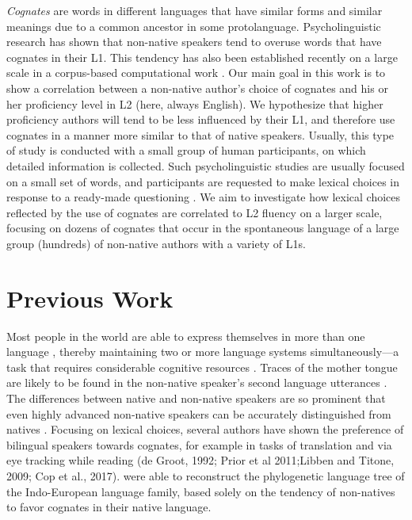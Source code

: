 \documentclass[11pt]{article}
\newcommand{\note}[1]{\textit{\small\color{magenta}{#1}}}
\begin{document}
\emph{Cognates} are words in different languages that have  similar forms and similar meanings due to a common ancestor in some protolanguage. Psycholinguistic research has shown that non-native speakers tend to overuse words that have cognates in their L1.  This tendency has also been established recently on a large scale in a corpus-based computational work \citep{TACL1403}.
Our main goal in this work is  to show a correlation between a non-native author's choice of cognates and his or her proficiency level in L2 (here, always English). 
We hypothesize that higher proficiency authors will tend to be less influenced by their L1, and therefore use cognates in a manner more similar to that of native speakers.
Usually, this type of study is conducted with a small group of human participants, on which detailed information is collected.  Such psycholinguistic studies are usually focused on a small set of words, and participants are requested to make lexical choices in response to a ready-made questioning \citep{prior:2006a,BIL:8852637}.
\note{Anat, please confirm}
We aim to investigate how lexical choices reflected by the use of cognates are correlated to L2 fluency on a larger scale, focusing on dozens of cognates that occur in the spontaneous language of a large group (hundreds) of non-native authors with a variety of L1s.

\section{Previous Work}

Most people in the world are able to express themselves in more than one language \citep{grosjean2012psycholinguistics}, thereby maintaining two or more language systems simultaneously---a task that requires considerable cognitive resources  \citep{schlesinger:2003,hvelplund2014eye,Prior2014,Kroll_Bobb_Hoshino_2014}.
Traces of the mother tongue are likely to be found in the non-native speaker's second language utterances \citep{jarvis2008crosslinguistic}. The differences between native and non-native speakers are so prominent that even highly advanced non-native speakers can be accurately distinguished from natives \citep{tomokiyo2001you,bergsma2012stylometric,DBLP:conf/acl/RabinovichNOW16,D18-1395}. 
Focusing on lexical choices, several authors have shown the preference of bilingual speakers towards cognates, for example in tasks of translation and via eye tracking while reading  (de Groot, 1992; Prior et al 2011;Libben and Titone, 2009; Cop et al., 2017). 
\note{fix refs}
\citet{TACL1403} were able to reconstruct the phylogenetic language tree of the Indo-European language family, based solely on the tendency of non-natives to favor cognates in their native language.
\end{document}
